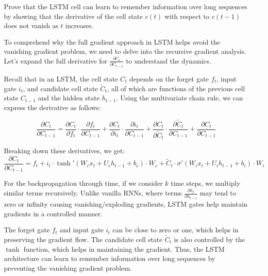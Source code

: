 Prove that the LSTM cell can learn to remember information over long sequences by showing that the derivative of the cell state $c(t)$ with respect to $c(t-1)$ does not vanish as $t$ increases.
\begin{qsolve}
    \begin{qsolve}[]
        To comprehend why the full gradient approach in LSTM helps avoid the vanishing gradient problem, we need to delve into the recursive gradient analysis. Let's expand the full derivative for $\frac{\partial C_t}{\partial C_{t-1}}$ to understand the dynamics.

        Recall that in an LSTM, the cell state $C_t$ depends on the forget gate $f_t$, input gate $i_t$, and candidate cell state $\tilde{C}_t$, all of which are functions of the previous cell state $C_{t-1}$ and the hidden state $h_{t-1}$. Using the multivariate chain rule, we can express the derivative as follows:

        \[
        \frac{\partial C_t}{\partial C_{t-1}} = \frac{\partial C_t}{\partial f_t} \cdot \frac{\partial f_t}{\partial C_{t-1}} + \frac{\partial C_t}{\partial i_t} \cdot \frac{\partial i_t}{\partial C_{t-1}} + \frac{\partial C_t}{\partial \tilde{C}_t} \cdot \frac{\partial \tilde{C}_t}{\partial C_{t-1}} + \frac{\partial C_t}{\partial C_{t-1}}
        \]

        Breaking down these derivatives, we get:
        \splitqsolve[\splitqsolve]
        \[
        \frac{\partial C_t}{\partial C_{t-1}} = f_t + i_t \cdot \tanh'(W_c x_t + U_c h_{t-1} + b_c) \cdot W_c + \tilde{C}_t \cdot \sigma'(W_i x_t + U_i h_{t-1} + b_i) \cdot W_i
        \]

        For the backpropagation through time, if we consider $k$ time steps, we multiply similar terms recursively. Unlike vanilla RNNs, where terms $\frac{\partial h_t}{\partial h_{t-1}}$ may tend to zero or infinity causing vanishing/exploding gradients, LSTM gates help maintain gradients in a controlled manner.
        
        The forget gate $f_t$ and input gate $i_t$ can be close to zero or one, which helps in preserving the gradient flow. The candidate cell state $\tilde{C}_t$ is also controlled by the $\tanh$ function, which helps in maintaining the gradient. Thus, the LSTM architecture can learn to remember information over long sequences by preventing the vanishing gradient problem.
    \end{qsolve}
\end{qsolve}